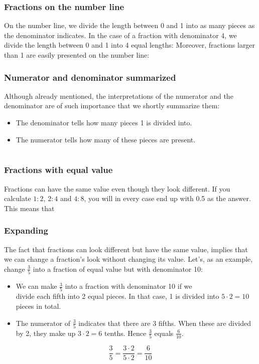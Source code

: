 \newpage
\subsubsection{Fractions on the number line}
On the number line, we divide the length between 0 and 1 into as many pieces as the denominator indicates. In the case of a fraction with denominator 4, we divide the length between 0 and 1 into 4 equal lengths:
Moreover, fractions larger than 1 are easily presented on the number line:
\subsubsection{Numerator and denominator summarized}
Although already mentioned, the interpretations of the numerator and the denominator are of such importance that we shortly summarize them:
\begin{itemize}
	\item The denominator tells how many pieces 1 is divided into.
	\item The numerator tells how many of these pieces are present.
\end{itemize}
\newpage
\section{\brvu}
\subsubsection{Fractions with equal value}
Fractions can have the same value even though they look different. If you calculate $ 1:2 $, $ 2:4 $ and $ 4:8 $, you will in every case end up with 0.5 as the answer. This means that
 \\[5pt]
 \vsk
{}
\subsubsection{Expanding}
The fact that fractions can look different but have the same value, implies that we can change a fraction's look without changing its value. Let's, as an example, change $ \frac{3}{5} $ into a fraction of equal value but with denominator 10:
\begin{itemize}
	\item We can make $ \frac{3}{5} $ into a fraction with denominator 10 if we\\ divide each fifth into 2 equal pieces. In that case, 1 is divided into $ {5\cdot2=10} $ pieces in total.
	\item The numerator of $ \frac{3}{5} $ indicates that there are 3 fifths. When these are divided by 2, they make up $ 3\cdot2=6 $ tenths. Hence $ \frac{3}{5} $ equals $ \frac{6}{10} $.
\end{itemize}
\[ \frac{3}{5}=\frac{3\cdot2}{5\cdot2}=\frac{6}{10} \]

